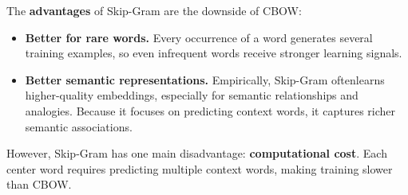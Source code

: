 \newpage

\noindent
The \textbf{advantages} of Skip-Gram are the downside of CBOW:
\begin{itemize}
    \item[\textcolor{Green3}{\faIcon{check}}] \textcolor{Green3}{\textbf{Better for rare words.}} Every occurrence of a word generates several training examples, so even infrequent words receive stronger learning signals.
    \item[\textcolor{Green3}{\faIcon{check}}] \textcolor{Green3}{\textbf{Better semantic representations.}} Empirically, Skip-Gram often\break learns higher-quality embeddings, especially for semantic relationships and analogies. Because it focuses on predicting context words, it captures richer semantic associations.
\end{itemize}
\textcolor{Red2}{} However, Skip-Gram has one main disadvantage: \textbf{computational cost}. Each center word requires predicting multiple context words, making training slower than CBOW.


